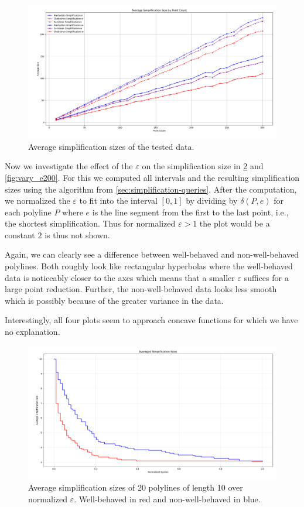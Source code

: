 \begin{figure}[b]
  \centering
	\includegraphics[scale=0.4]{./figures/simplification_sizes.png}
  \caption{Average simplification sizes of the tested data.}
  \label{fig:simplification_sizes}
\end{figure}

Now we investigate the effect of the \(\varepsilon\) on the simplification size in \cref{fig:vary_e10} and \cref{fig:vary_e200}. For this we computed all intervals and the resulting simplification sizes using the algorithm from \cref{sec:simplification-queries}. After the computation, we normalized the \(\varepsilon\) to fit into the interval \([0, 1]\) by dividing by \(\delta(P, e)\) for each polyline \(P\) where \(e\) is the line segment from the first to the last point, i.e., the shortest simplification. Thus for normalized \(\varepsilon > 1\) the plot would be a constant \(2\) is thus not shown. 

Again, we can clearly see a difference between well-behaved and non-well-behaved polylines. Both roughly look like rectangular hyperbolas where the well-behaved data is noticeably closer to the axes which means that a smaller \(\varepsilon\) suffices for a large point reduction. Further, the non-well-behaved data looks less smooth which is possibly because of the greater variance in the data.

Interestingly, all four plots seem to approach concave functions for which we have no explanation.

\begin{figure}[b]
  \centering
	\includegraphics[scale=0.4]{./figures/vary_e10.png}
  \caption{Average simplification sizes of 20 polylines of length 10 over normalized \(\varepsilon\). Well-behaved in red and non-well-behaved in blue.}
  \label{fig:vary_e10}
\end{figure}

